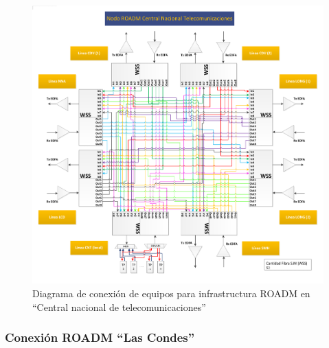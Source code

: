 \begin{figure}[H]
  \centering
  \includegraphics[width=17cm]{Imagenes/CNT.pdf}
  \caption{Diagrama de conexión de equipos para infrastructura ROADM en ``Central nacional de telecomunicaciones''}
  \label{fig:drcnt}
\end{figure}

\subsubsection{Conexión ROADM ``Las Condes''}
\label{sec:drlcd}

